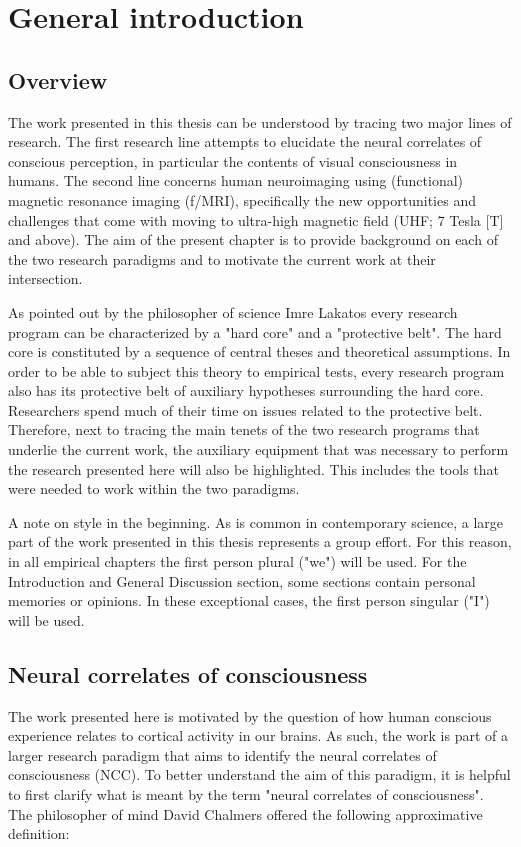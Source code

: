 \chapter{General introduction}
\label{ch:chapter01}
\clearpage{\thispagestyle{empty}\cleardoublepage}

\section{Overview}
The work presented in this thesis can be understood by tracing two major lines of research. The first research line attempts to elucidate the neural correlates of conscious perception, in particular the contents of visual consciousness in humans. The second line concerns human neuroimaging using (functional) magnetic resonance imaging (f/MRI), specifically the new opportunities and challenges that come with moving to ultra-high magnetic field (UHF; 7 Tesla [T] and above). The aim of the present chapter is to provide background on each of the two research paradigms and to motivate the current work at their intersection.

As pointed out by the philosopher of science Imre Lakatos \parencite*{Lakatos1970} every research program can be characterized by a "hard core" and a "protective belt". The hard core is constituted by a sequence of central theses and theoretical assumptions. In order to be able to subject this theory to empirical tests, every research program also has its protective belt of auxiliary hypotheses surrounding the hard core. Researchers spend much of their time on issues related to the protective belt. Therefore, next to tracing the main tenets of the two research programs that underlie the current work, the auxiliary equipment that was necessary to perform the research presented here will also be highlighted. This includes the tools that were needed to work within the two paradigms.

A note on style in the beginning. As is common in contemporary science, a large part of the work presented in this thesis represents a group effort. For this reason, in all empirical chapters the first person plural ("we") will be used. For the Introduction and General Discussion section, some sections contain personal memories or opinions. In these exceptional cases, the first person singular ("I") will be used.

\section{Neural correlates of consciousness}
The work presented here is motivated by the question of how human conscious experience relates to cortical activity in our brains. As such, the work is part of a larger research paradigm that aims to identify the neural correlates of consciousness (NCC). To better understand the aim of this paradigm, it is helpful to first clarify what is meant by the term "neural correlates of consciousness". The philosopher of mind David Chalmers \parencite*{Chalmers2000} offered the following approximative definition:

